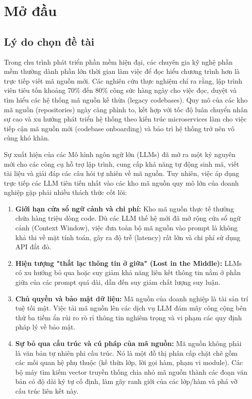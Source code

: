 \documentclass[12pt,a4paper,oneside]{report}
\begin{document}

\chapter{Mở đầu}

\section{Lý do chọn đề tài}
Trong chu trình phát triển phần mềm hiện đại, các chuyên gia kỹ nghệ phần mềm thường dành phần lớn thời gian làm việc để đọc hiểu chương trình hơn là trực tiếp viết mã nguồn mới. Các nghiên cứu thực nghiệm chỉ ra rằng, lập trình viên tiêu tốn khoảng 70\% đến 80\% công sức hàng ngày cho việc đọc, duyệt và tìm hiểu các hệ thống mã nguồn kế thừa (legacy codebases). Quy mô của các kho mã nguồn (repositories) ngày càng phình to, kết hợp với tốc độ luân chuyển nhân sự cao và xu hướng phát triển hệ thống theo kiến trúc microservices làm cho việc tiếp cận mã nguồn mới (codebase onboarding) và bảo trì hệ thống trở nên vô cùng khó khăn.

Sự xuất hiện của các Mô hình ngôn ngữ lớn (LLMs) đã mở ra một kỷ nguyên mới cho các công cụ hỗ trợ lập trình, cung cấp khả năng tự động sinh mã, viết tài liệu và giải đáp các câu hỏi tự nhiên về mã nguồn. Tuy nhiên, việc áp dụng trực tiếp các LLM tiên tiến nhất vào các kho mã nguồn quy mô lớn của doanh nghiệp gặp phải nhiều thách thức cốt lõi:
\begin{enumerate}
    \item \textbf{Giới hạn cửa sổ ngữ cảnh và chi phí:} Kho mã nguồn thực tế thường chứa hàng triệu dòng code. Dù các LLM thế hệ mới đã mở rộng cửa sổ ngữ cảnh (Context Window), việc đưa toàn bộ mã nguồn vào prompt là không khả thi về mặt tính toán, gây ra độ trễ (latency) rất lớn và chi phí sử dụng API đắt đỏ.
    \item \textbf{Hiện tượng "thất lạc thông tin ở giữa" (Lost in the Middle):} LLMs có xu hướng bỏ qua hoặc suy giảm khả năng liên kết thông tin nằm ở phần giữa của các prompt quá dài, dẫn đến suy giảm chất lượng suy luận.
    \item \textbf{Chủ quyền và bảo mật dữ liệu:} Mã nguồn của doanh nghiệp là tài sản trí tuệ tối mật. Việc tải mã nguồn lên các dịch vụ LLM đám mây công cộng bên thứ ba tiềm ẩn rủi ro rò rỉ thông tin nghiêm trọng và vi phạm các quy định pháp lý về bảo mật.
    \item \textbf{Sự bỏ qua cấu trúc và cú pháp của mã nguồn:} Mã nguồn không phải là văn bản tự nhiên phi cấu trúc. Nó là một đồ thị phân cấp chặt chẽ gồm các mối quan hệ phụ thuộc (kế thừa lớp, lời gọi hàm, phạm vi module). Các bộ máy tìm kiếm vector truyền thống chia nhỏ mã nguồn thành các đoạn văn bản có độ dài ký tự cố định, làm gãy ranh giới của các lớp/hàm và phá vỡ cấu trúc liên kết này.
\end{enumerate}
\end{document}
